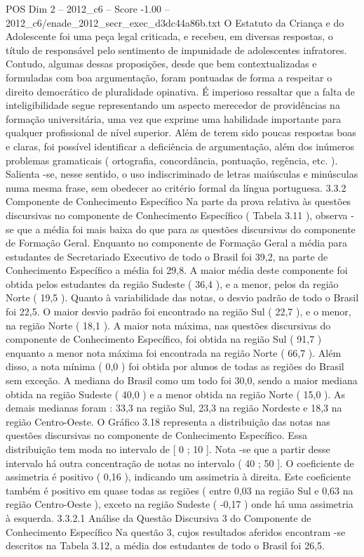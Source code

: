 \begin{textsample}{POS Dim 2 – 2012\_c6 – Score -1.00 – 2012\_c6/enade\_2012\_secr\_exec\_d3dc44a86b.txt}
O Estatuto da Criança e do Adolescente foi uma peça legal criticada, e recebeu, em diversas respostas, o título de responsável pelo sentimento de impunidade de adolescentes infratores.
Contudo, algumas dessas proposições, desde que bem contextualizadas e formuladas com boa argumentação, foram pontuadas de forma a respeitar o direito democrático de pluralidade opinativa.
É imperioso ressaltar que a falta de inteligibilidade segue representando um aspecto merecedor de providências na formação universitária, uma vez que exprime uma habilidade importante para qualquer profissional de nível superior.
Além de terem sido poucas respostas boas e claras, foi possível identificar a deficiência de argumentação, além dos inúmeros problemas gramaticais ( ortografia, concordância, pontuação, regência, etc. ).
Salienta -se, nesse sentido, o uso indiscriminado de letras maiúsculas e minúsculas numa mesma frase, sem obedecer ao critério formal da língua portuguesa. 3.3.2 Componente de Conhecimento Específico Na parte da prova relativa às questões discursivas no componente de Conhecimento Específico ( Tabela 3.11 ), observa -se que a média foi mais baixa do que para as questões discursivas do componente de Formação Geral.
Enquanto no componente de Formação Geral a média para estudantes de Secretariado Executivo de todo o Brasil foi 39,2, na parte de Conhecimento Específico a média foi 29,8.
A maior média deste componente foi obtida pelos estudantes da região Sudeste ( 36,4 ), e a menor, pelos da região Norte ( 19,5 ).
Quanto à variabilidade das notas, o desvio padrão de todo o Brasil foi 22,5.
O maior desvio padrão foi encontrado na região Sul ( 22,7 ), e o menor, na região Norte ( 18,1 ).
A maior nota máxima, nas questões discursivas do componente de Conhecimento Específico, foi obtida na região Sul ( 91,7 ) enquanto a menor nota máxima foi encontrada na região Norte ( 66,7 ).
Além disso, a nota mínima ( 0,0 ) foi obtida por alunos de todas as regiões do Brasil sem exceção.
A mediana do Brasil como um todo foi 30,0, sendo a maior mediana obtida na região Sudeste ( 40,0 ) e a menor obtida na região Norte ( 15,0 ).
As demais medianas foram : 33,3 na região Sul, 23,3 na região Nordeste e 18,3 na região Centro-Oeste.
O Gráfico 3.18 representa a distribuição das notas nas questões discursivas no componente de Conhecimento Específico.
Essa distribuição tem moda no intervalo de [ 0 ; 10 ].
Nota -se que a partir desse intervalo há outra concentração de notas no intervalo ( 40 ; 50 ].
O coeficiente de assimetria é positivo ( 0,16 ), indicando um assimetria à direita.
Este coeficiente também é positivo em quase todas as regiões ( entre 0,03 na região Sul e 0,63 na região Centro-Oeste ), exceto na região Sudeste ( -0,17 ) onde há uma assimetria à esquerda. 3.3.2.1 Análise da Questão Discursiva 3 do Componente de Conhecimento Específico Na questão 3, cujos resultados aferidos encontram -se descritos na Tabela 3.12, a média dos estudantes de todo o Brasil foi 26,5.

\end{textsample}
